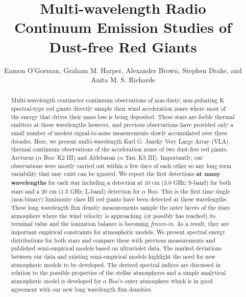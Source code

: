 \documentclass[iop]{emulateapj}
\begin{document}
\title{Multi-wavelength Radio Continuum Emission Studies of Dust-free Red Giants}


\author{Eamon O'Gorman, Graham M. Harper, Alexander Brown, Stephen Drake, and Anita M. S. Richards}


\begin{abstract}

Multi-wavelength centimeter continuum observations of non-dusty, non-pulsating K spectral-type red giants directly sample their wind acceleration zones where most of the energy that drives their mass loss is being deposited. These stars are feeble thermal emitters at these wavelengths however, and previous observations have provided only a small number of modest signal-to-noise measurements slowly accumulated over three decades. Here, we present multi-wavelength Karl G. Jansky Very Large Array (VLA) thermal continuum observations of the acceleration zones of two dust-free red giants, Arcturus ($\alpha$ Boo: K2 III) and Aldebaran ($\alpha$ Tau: K5 III). Importantly, our observations were mostly carried out within a few days of each other so any long term variability that may exist can be ignored. We report the first detections \textbf{at many wavelengths} for each star including a detection at 10 cm (3.0 GHz; S-band) for both stars and a 20 cm (1.5 GHz; L-band) detection for $\alpha$ Boo. This is the first time single (non-binary) luminosity class III red giants have been detected at these wavelengths. These long wavelength flux density measurements sample the outer layers of the stars atmosphere where the wind velocity is approaching (or possibly has reached) its terminal value and the ionization balance is becoming \textit{frozen-in}. As a result, they are important empirical constraints for atmospheric models. We present spectral energy distributions for both stars and compare these with previous measurements and published semi-empirical models based on ultraviolet data. The marked deviations between our data and existing semi-empirical models highlight the need for new atmospheric models to be developed. The derived spectral indices are discussed in relation to the possible properties of the stellar atmospheres and a simple analytical atmospheric model is developed for $\alpha$ Boo's outer atmosphere which is in good agreement with our new long wavelength flux densities.

\end{abstract}
\end{document}
